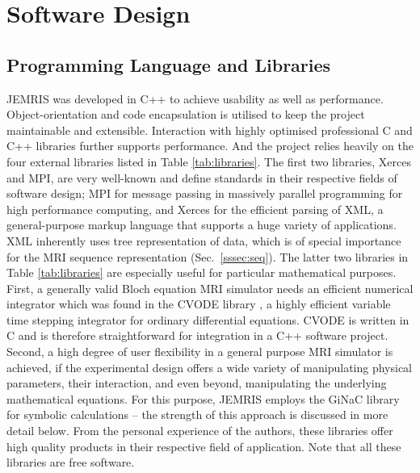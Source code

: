 \documentclass[journal,onecolumn,12pt]{IEEEtran}
\begin{document}
\section{Software Design}

\subsection{Programming Language and Libraries}

JEMRIS was developed in C++ to achieve usability as well as performance. Object-orientation and code encapsulation is
utilised to keep the project maintainable and extensible. Interaction with highly optimised professional C and C++
libraries further supports performance. And the project relies heavily on the four external libraries listed in Table
\ref{tab:libraries}. The first two libraries, Xerces and MPI, are very well-known and define standards in their
respective fields of software design; MPI for message passing in massively parallel programming for high performance
computing, and Xerces for the efficient parsing of XML, a general-purpose markup language that supports a huge variety
of applications. XML inherently uses tree representation of data, which is of special importance for the MRI sequence
representation (Sec.~\ref{sssec:seq}). The latter two libraries in Table \ref{tab:libraries} are especially useful for
particular mathematical purposes. First, a generally valid Bloch equation MRI simulator needs an efficient numerical
integrator which was found in the CVODE library \cite{cohen}, a highly efficient variable time stepping integrator for
ordinary differential equations. CVODE is written in C and is therefore straightforward for integration in a C++
software project. Second, a high degree of user flexibility in a general purpose MRI simulator is achieved, if the
experimental design offers a wide variety of manipulating physical parameters, their interaction, and even beyond,
manipulating the underlying mathematical equations. For this purpose, JEMRIS employs the GiNaC library for symbolic
calculations -- the strength of this approach is discussed in more detail below. From the personal experience of the
authors, these libraries offer high quality products in their respective field of application. Note that all these
libraries are free software.
\end{document}
